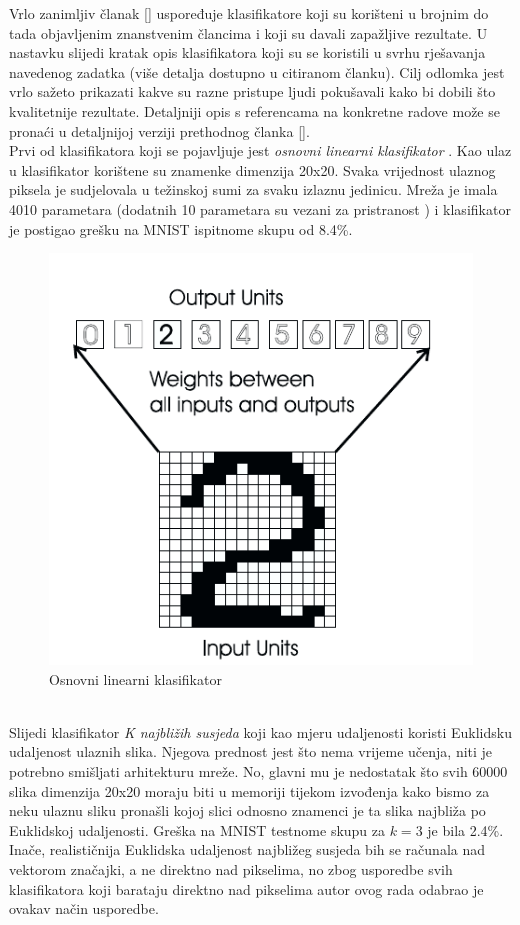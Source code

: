 \documentclass[times, utf8, diplomski]{fer}
\theoremstyle{definition}
\begin{document}
Vrlo zanimljiv članak [\cite{LeCun95comparisonof}] uspoređuje klasifikatore koji su korišteni u brojnim do tada objavljenim znanstvenim člancima i koji su davali zapažljive rezultate. U nastavku slijedi kratak opis klasifikatora koji su se koristili u svrhu rješavanja navedenog zadatka (više detalja dostupno u citiranom članku). Cilj odlomka jest vrlo sažeto prikazati kakve su razne pristupe ljudi pokušavali kako bi dobili što kvalitetnije rezultate. Detaljniji opis s referencama na konkretne radove može se pronaći u detaljnijoj verziji prethodnog članka [\cite{Lecun95learningalgorithms}].
\\
Prvi od klasifikatora koji se pojavljuje jest \textit{osnovni linearni klasifikator} . Kao ulaz u klasifikator korištene su znamenke dimenzija 20x20. Svaka vrijednost ulaznog piksela je sudjelovala u težinskoj sumi za svaku izlaznu jedinicu. Mreža je imala 4010 parametara (dodatnih 10 parametara su vezani za pristranost ) i klasifikator je postigao grešku na MNIST ispitnome skupu od 8.4\%.
\begin{figure}[h]
\centering
\includegraphics[scale=0.7]{linear_classifier.png}
\caption{Osnovni linearni klasifikator}
\end{figure}
\\
Slijedi klasifikator \textit{K najbližih susjeda}  koji kao mjeru udaljenosti koristi Euklidsku udaljenost ulaznih slika. Njegova prednost jest što nema vrijeme učenja, niti je potrebno smišljati arhitekturu mreže. No, glavni mu je nedostatak što svih 60000 slika dimenzija 20x20 moraju biti u memoriji tijekom izvođenja kako bismo za neku ulaznu sliku pronašli kojoj slici odnosno znamenci je ta slika najbliža po Euklidskoj udaljenosti. Greška na MNIST testnome skupu za $k=3$ je bila 2.4\%. Inače, realističnija Euklidska udaljenost najbližeg susjeda bih se računala nad vektorom značajki, a ne direktno nad pikselima, no zbog usporedbe svih klasifikatora koji barataju direktno nad pikselima autor ovog rada odabrao je ovakav način usporedbe.
\end{document}
